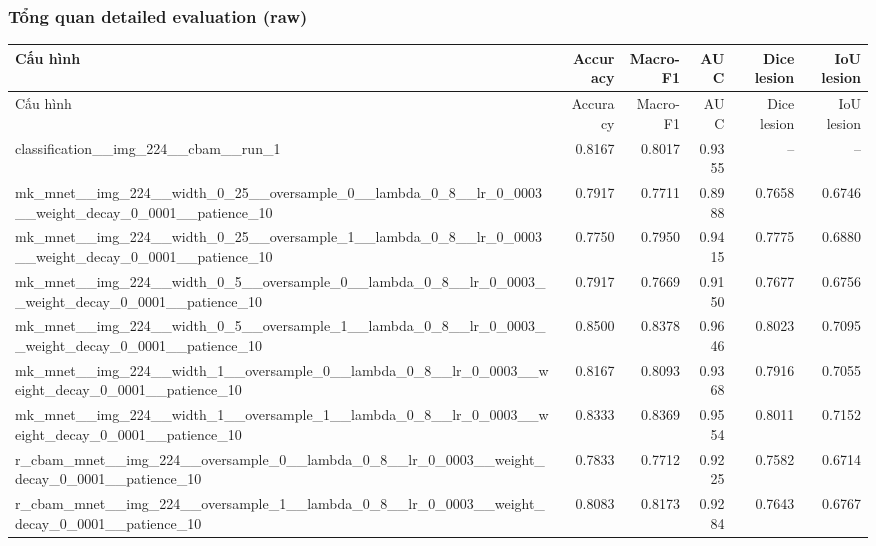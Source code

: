 \subsubsection*{Tổng quan detailed evaluation (raw)}
\scriptsize
\begin{longtable}{p{5.0cm}rrrrr}
\toprule
Cấu hình & Accuracy & Macro-F1 & AUC & Dice lesion & IoU lesion \\
\midrule
\endfirsthead
\toprule
Cấu hình & Accuracy & Macro-F1 & AUC & Dice lesion & IoU lesion \\
\midrule
\endhead
classification\_\_img\_224\_\_cbam\_\_run\_1 & 0.8167 & 0.8017 & 0.9355 & -- & -- \\
mk\_mnet\_\_img\_224\_\_width\_0\_25\_\_oversample\_0\_\_lambda\_0\_8\_\_lr\_0\_0003\_\_weight\_decay\_0\_0001\_\_patience\_10 & 0.7917 & 0.7711 & 0.8988 & 0.7658 & 0.6746 \\
mk\_mnet\_\_img\_224\_\_width\_0\_25\_\_oversample\_1\_\_lambda\_0\_8\_\_lr\_0\_0003\_\_weight\_decay\_0\_0001\_\_patience\_10 & 0.7750 & 0.7950 & 0.9415 & 0.7775 & 0.6880 \\
mk\_mnet\_\_img\_224\_\_width\_0\_5\_\_oversample\_0\_\_lambda\_0\_8\_\_lr\_0\_0003\_\_weight\_decay\_0\_0001\_\_patience\_10 & 0.7917 & 0.7669 & 0.9150 & 0.7677 & 0.6756 \\
mk\_mnet\_\_img\_224\_\_width\_0\_5\_\_oversample\_1\_\_lambda\_0\_8\_\_lr\_0\_0003\_\_weight\_decay\_0\_0001\_\_patience\_10 & 0.8500 & 0.8378 & 0.9646 & 0.8023 & 0.7095 \\
mk\_mnet\_\_img\_224\_\_width\_1\_\_oversample\_0\_\_lambda\_0\_8\_\_lr\_0\_0003\_\_weight\_decay\_0\_0001\_\_patience\_10 & 0.8167 & 0.8093 & 0.9368 & 0.7916 & 0.7055 \\
mk\_mnet\_\_img\_224\_\_width\_1\_\_oversample\_1\_\_lambda\_0\_8\_\_lr\_0\_0003\_\_weight\_decay\_0\_0001\_\_patience\_10 & 0.8333 & 0.8369 & 0.9554 & 0.8011 & 0.7152 \\
r\_cbam\_mnet\_\_img\_224\_\_oversample\_0\_\_lambda\_0\_8\_\_lr\_0\_0003\_\_weight\_decay\_0\_0001\_\_patience\_10 & 0.7833 & 0.7712 & 0.9225 & 0.7582 & 0.6714 \\
r\_cbam\_mnet\_\_img\_224\_\_oversample\_1\_\_lambda\_0\_8\_\_lr\_0\_0003\_\_weight\_decay\_0\_0001\_\_patience\_10 & 0.8083 & 0.8173 & 0.9284 & 0.7643 & 0.6767 \\
\bottomrule
\end{longtable}
\normalsize
